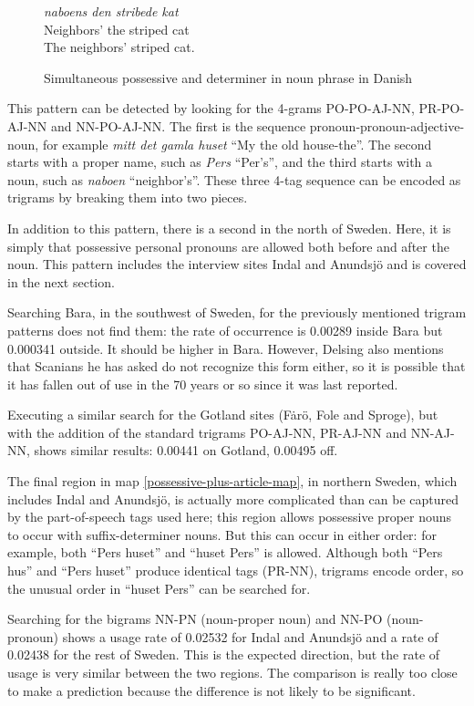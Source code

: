 \begin{figure}
  {\it naboens den stribede kat} \\
  Neighbors' the striped cat \\
  The neighbors' striped cat.
  \caption{Simultaneous possessive and determiner in noun phrase in
    Danish}
  \label{possessive-plus-article-example}
\end{figure}

This pattern can be detected by looking for the
4-grams PO-PO-AJ-NN, PR-PO-AJ-NN and NN-PO-AJ-NN. The first is the
sequence pronoun-pronoun-adjective-noun, for example {\it mitt det
  gamla huset} ``My the old house-the''. The second starts with a
proper name, such as {\it Pers} ``Per's'', and the third starts with a
noun, such as {\it naboen} ``neighbor's''. These three 4-tag sequence
can be encoded as trigrams by breaking them into two pieces.

In addition to this pattern, there is a second in the north of
Sweden. Here, it is simply that possessive personal pronouns are
allowed both before and after the noun. This pattern includes the
interview sites Indal and Anundsj\"o and is covered in the next
section.

Searching Bara, in the southwest of Sweden, for the previously
mentioned trigram patterns does not find them: the rate of occurrence
is 0.00289 inside Bara but 0.000341 outside. It should be higher in
Bara. However, Delsing also mentions that Scanians he has asked do not
recognize this form either, so it is possible that it has fallen out
of use in the 70 years or so since it was last reported.

Executing a similar search for the Gotland sites (F\.ar\"o, Fole and
Sproge), but with the addition of the standard trigrams PO-AJ-NN,
PR-AJ-NN and NN-AJ-NN, shows similar results: 0.00441 on Gotland,
0.00495 off.

The final region in map \ref{possessive-plus-article-map}, in northern
Sweden, which includes Indal and Anundsj\"o, is actually more
complicated than can be captured by the part-of-speech tags used here;
this region allows possessive proper nouns to occur with
suffix-determiner nouns. But this can occur in either order: for
example, both ``Pers huset'' and ``huset Pers'' is allowed. Although
both ``Pers hus'' and ``Pers huset'' produce identical tags (PR-NN),
trigrams encode order, so the unusual order in ``huset Pers'' can be
searched for.

Searching for the bigrams NN-PN (noun-proper noun) and NN-PO
(noun-pronoun) shows a usage rate of 0.02532 for Indal and Anundsj\"o
and a rate of 0.02438 for the rest of Sweden. This is the expected
direction, but the rate of usage is very similar between the two
regions. The comparison is really too close to make a prediction
because the difference is not likely to be significant.

